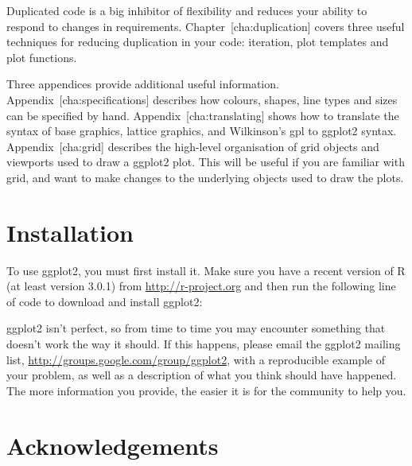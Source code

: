 Duplicated code is a big inhibitor of flexibility and reduces your
ability to respond to changes in requirements.
Chapter~{[}cha:duplication{]} covers three useful techniques for
reducing duplication in your code: iteration, plot templates and plot
functions.

Three appendices provide additional useful information.
Appendix~{[}cha:specifications{]} describes how colours, shapes, line
types and sizes can be specified by hand. Appendix~{[}cha:translating{]}
shows how to translate the syntax of base graphics, lattice graphics,
and Wilkinson's gpl to ggplot2 syntax. Appendix~{[}cha:grid{]} describes
the high-level organisation of grid objects and viewports used to draw a
ggplot2 plot. This will be useful if you are familiar with grid, and
want to make changes to the underlying objects used to draw the plots.

\section{Installation}\label{sub:installation}

To use ggplot2, you must first install it. Make sure you have a recent
version of R (at least version 3.0.1) from \url{http://r-project.org}
and then run the following line of code to download and install ggplot2:

\begin{Shaded}
\begin{Highlighting}[]
\NormalTok{(}\NormalTok{)}
\end{Highlighting}
\end{Shaded}

ggplot2 isn't perfect, so from time to time you may encounter something
that doesn't work the way it should. If this happens, please email the
ggplot2 mailing list, \url{http://groups.google.com/group/ggplot2}, with
a reproducible example of your problem, as well as a description of what
you think should have happened. The more information you provide, the
easier it is for the community to help you.

\section{Acknowledgements}\label{sec:acknolwedgements}

